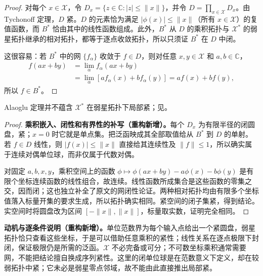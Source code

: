 \documentclass[../../main.tex]{subfiles}
\begin{document}
\begin{proof}
对每个 $x\in\mathcal X$，令 $D_x=\{z\in\mathbb C:|z|\le\|x\|\}$，并令 $D=\prod_{x\in\mathcal X}D_x$。由 Tychonoff 定理，$D$ 紧。$D$ 的元素恰为满足 $|\phi(x)|\le\|x\|$（所有 $x\in\mathcal X$）的复值函数，而 $B^*$ 恰由其中的线性函数组成。此外，$B^*$ 从 $D$ 的乘积拓扑与 $\mathcal X^*$ 的弱星拓扑继承的相对拓扑，都等于逐点收敛拓扑，所以只须证 $B^*$ 在 $D$ 中闭。

这很容易：若 $B^*$ 中的网 $\{f_\alpha\}$ 收敛于 $f\in D$，则对任意 $x,y\in\mathcal X$ 和 $a,b\in\mathbb C$，
\begin{align*}
f(ax+by)&=\lim_\alpha f_\alpha(ax+by)\\
&=\lim_\alpha[af_\alpha(x)+bf_\alpha(y)]=af(x)+bf(y),
\end{align*}
所以 $f\in B^*$。
\end{proof}
\begin{remark}
Alaoglu 定理并不蕴含 $\mathcal X^*$ 在弱星拓扑下局部紧；见。
\end{remark}
\begin{proof}
\textbf{乘积嵌入、闭性和有界性的补写（重构新增）。}每个 $D_x$ 为有限半径的闭圆盘，紧；$x=0$ 时它就是单点集。把泛函映成其全部取值给从 $B^*$ 到 $D$ 的单射。若 $f\in D$ 线性，则 $|f(x)|\le\|x\|$ 直接给其连续性及 $\|f\|\le1$，所以确实属于连续对偶单位球，而非仅属于代数对偶。

对固定 $a,b,x,y$，乘积空间上的函数 $\phi\mapsto\phi(ax+by)-a\phi(x)-b\phi(y)$ 是有限个坐标连续函数的线性组合，故连续。线性函数所成集合是这些函数的零集之交，因而闭；这也独立补全了原文的网闭性论证。两种相对拓扑均由有限多个坐标值落入标量开集的要求生成，所以拓扑确实相同。紧空间的闭子集紧，得到结论。实空间时将圆盘改为区间 $[-\|x\|,\|x\|]$，标量取实数，证明完全相同。
\end{proof}
\begin{remark}
\textbf{动机与逐条件说明（重构新增）。}单位范数界为每个输入点给出一个紧圆盘，弱星拓扑恰只查看这些坐标，于是可以借助任意乘积的紧性；线性关系在逐点极限下封闭，保证极限仍是所需的泛函。$\mathcal X$ 不必完备或可分；不可数坐标乘积通常需要网，不能把结论擅自换成序列紧性。这里的闭单位球是在范数意义下定义，却在较弱拓扑中紧；它未必是弱星零点邻域，故不能由此直接推出局部紧。
\end{remark}

\end{document}
